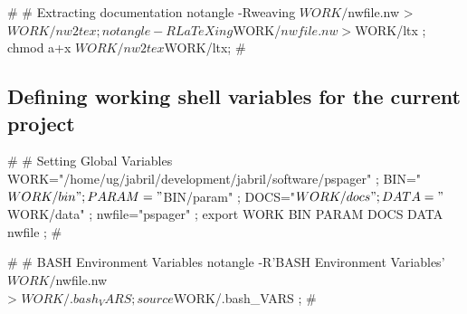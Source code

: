 \documentclass[11pt]{article}
\def\nwendcode{\endtrivlist \endgroup} %
\let\nwdocspar=\par                    %
\newcommand{\subsctn}[1]{\subsection{#1}}
\begin{document}
\nwenddocs{}\plusendmoddef
#
# Extracting documentation
notangle -Rweaving  $WORK/$nwfile.nw > $WORK/nw2tex ;
notangle -RLaTeXing $WORK/$nwfile.nw > $WORK/ltx ;
chmod a+x $WORK/nw2tex $WORK/ltx;
#
\nwendcode{}\nwdocspar

\subsctn{Defining working shell variables for the current project} %

\nwenddocs{}\endmoddef
#
# Setting Global Variables
WORK="/home/ug/jabril/development/jabril/software/pspager" ;
BIN="$WORK/bin" ;
PARAM="$BIN/param" ;
DOCS="$WORK/docs" ;
DATA="$WORK/data" ;
nwfile="pspager" ;
export WORK BIN PARAM DOCS DATA nwfile ;
#
\nwendcode{}\nwdocspar

\nwenddocs{}\plusendmoddef
#
# BASH Environment Variables
notangle -R'BASH Environment Variables' $WORK/$nwfile.nw \\
         > $WORK/.bash_VARS ; 
source $WORK/.bash_VARS ;
#
\nwendcode{}
\end{document}
